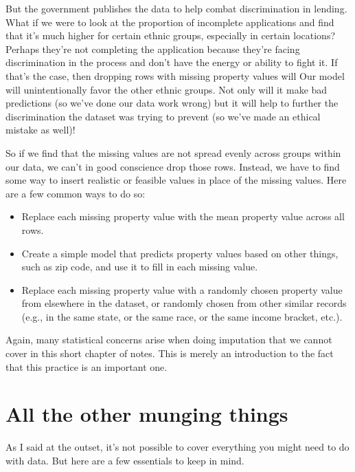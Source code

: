 \documentclass[letterpaper,10pt,english]{jupyterBook}
\begin{document}
\sphinxAtStartPar
But the government publishes the data to help combat discrimination in lending.  What if we were to look at the proportion of incomplete applications and find that it’s much higher for certain ethnic groups, especially in certain locations?  Perhaps they’re not completing the application because they’re facing discrimination in the process and don’t have the energy or ability to fight it.  If that’s the case, then dropping rows with missing property values will   Our model will unintentionally favor the other ethnic groups.  Not only will it make bad predictions (so we’ve done our data work wrong) but it will help to further the discrimination the dataset was trying to prevent (so we’ve made an ethical mistake as well)!

\sphinxAtStartPar
So if we find that the missing values are not spread evenly across groups within our data, we can’t in good conscience drop those rows.  Instead, we have to find some way to insert realistic or feasible values in place of the missing values.  Here are a few common ways to do so:
\begin{itemize}
\item {} 
\sphinxAtStartPar
{} \sphinxhyphen{} Replace each missing property value with the mean property value across all rows.

\item {} 
\sphinxAtStartPar
{} \sphinxhyphen{} Create a simple model that predicts property values based on other things, such as zip code, and use it to fill in each missing value.

\item {} 
\sphinxAtStartPar
{} \sphinxhyphen{} Replace each missing property value with a randomly chosen property value from elsewhere in the dataset, or randomly chosen from other similar records (e.g., in the same state, or the same race, or the same income bracket, etc.).

\end{itemize}

\sphinxAtStartPar
Again, many statistical concerns arise when doing imputation that we cannot cover in this short chapter of notes.  This is merely an introduction to the fact that this practice is an important one.


\section{All the other munging things}
\label{\detokenize{chapter-13-etl:all-the-other-munging-things}}
\sphinxAtStartPar
As I said at the outset, it’s not possible to cover everything you might need to do with data.  But here are a few essentials to keep in mind.
\end{document}
